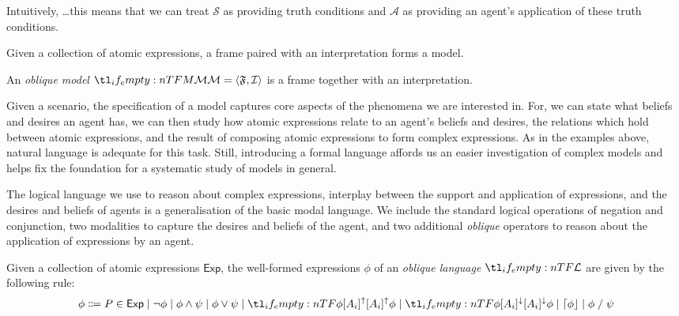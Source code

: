 \documentclass[10pt]{article}
\begin{document}
{\color{red} Intuitively, \dots this means that we can treat \(\mathcal{S}\) as providing truth conditions and \(\mathcal{A}\) as providing an agent's application of these truth conditions.}

Given a collection of atomic expressions, a frame paired with an interpretation forms a model.

\begin{definition}[Model]
  An \emph{oblique model} \(\omodel{M} = \langle \oframe{F}, \ointp{I} \rangle\) is a frame together with an interpretation.
\end{definition}

Given a scenario, the specification of a model captures core aspects of the phenomena we are interested in.
For, we can state what beliefs and desires an agent has, we can then study how atomic expressions relate to an agent's beliefs and desires, the relations which hold between atomic expressions, and the result of composing atomic expressions to form complex expressions.
As in the examples above, natural language is adequate for this task.
Still, introducing a formal language affords us an easier investigation of complex models and helps fix the foundation for a systematic study of models in general.

The logical language we use to reason about complex expressions, interplay between the support and application of expressions, and the desires and beliefs of agents is a generalisation of the basic modal language.
We include the standard logical operations of negation and conjunction, two modalities to capture the desires and beliefs of the agent, and two additional \emph{oblique} operators to reason about the application of expressions by an agent.

\begin{definition}
  Given a collection of atomic expressions \(\mathsf{Exp}\), the well-formed expressions \(\phi\) of an \emph{oblique language} \(\olang{}\) are given by the following rule:
  \[
    \phi \Coloneqq P \in \mathsf{Exp} \bnfsep \lnot\phi \bnfsep \phi\land\psi \bnfsep \phi\lor\psi \bnfsep \lattu[A_{i}]{\phi} \bnfsep \lattd[A_{i}]{\phi} \bnfsep \attn{\phi} \bnfsep \phi \ltrans \psi
  \]
\end{definition}
\end{document}
